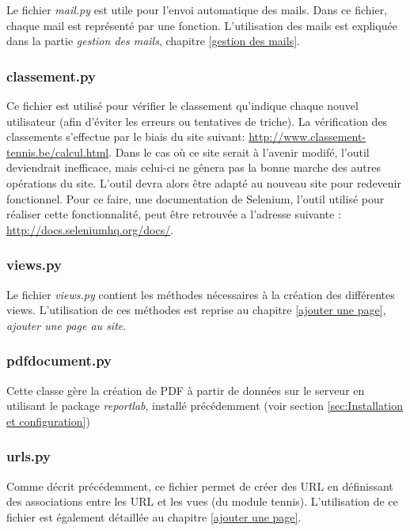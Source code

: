 Le fichier \textit{mail.py} est utile pour l'envoi automatique des mails. Dans ce fichier, chaque mail est représenté par une fonction. L'utilisation des mails est expliquée dans la partie \textit{gestion des mails}, chapitre \ref{gestion des mails}.

\subsubsection{classement.py} 

Ce fichier est utilisé pour vérifier le classement qu'indique chaque nouvel utilisateur (afin d'éviter les erreurs ou tentatives de triche). La vérification des classements s'effectue par le biais du site suivant: \url{http://www.classement-tennis.be/calcul.html}. Dans le cas où ce site serait à l'avenir modifé, l'outil deviendrait inefficace, mais celui-ci ne gênera pas la bonne marche des autres opérations du site. L'outil devra alors être adapté au nouveau site pour redevenir fonctionnel. Pour ce faire, une documentation de Selenium, l'outil utilisé pour réaliser cette fonctionnalité, peut être retrouvée a l'adresse suivante : \url{http://docs.seleniumhq.org/docs/}. 

\subsubsection{views.py}

Le fichier \textit{views.py} contient les méthodes nécessaires à la création des différentes views. L'utilisation de ces méthodes est reprise au chapitre \ref{ajouter une page}, \textit{ajouter une page au site}.

\subsubsection{pdfdocument.py}

Cette classe gère la création de PDF à partir de données sur le serveur en utilisant le package \textit{reportlab}, installé précédemment (voir section \ref{sec:Installation et configuration})

\subsubsection{urls.py}

Comme décrit précédemment, ce fichier permet de créer des URL en définissant des associations entre les URL et les vues (du module tennis). L'utilisation de ce fichier est également détaillée au chapitre \ref{ajouter une page}.